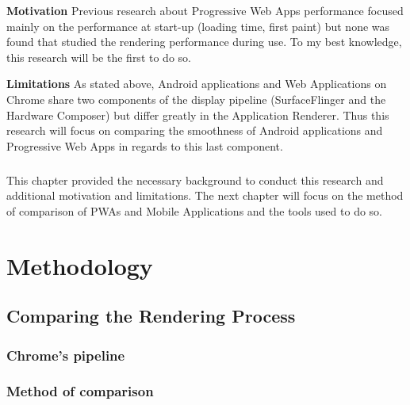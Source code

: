 \documentclass{kththesis}
\begin{document}
\textbf{Motivation} \newline
Previous research about Progressive Web Apps performance focused mainly on the performance at start-up (loading time, first paint) but none was found that studied the rendering performance during use. To my best knowledge, this research will be the first to do so.

\medskip
\textbf{Limitations} \newline
As stated above, Android applications and Web Applications on Chrome share two components of the display pipeline (SurfaceFlinger and the Hardware Composer) but differ greatly in the Application Renderer. Thus this research will focus on comparing the smoothness of Android applications and Progressive Web Apps in regards to this last component. 



\paragraph{}
This chapter provided the necessary background to conduct this research and additional motivation and limitations. The next chapter will focus on the method of comparison of PWAs and Mobile Applications and the tools used to do so.

    

\chapter{Methodology}
\section{Comparing the Rendering Process}
   

    \subsection{Chrome's pipeline}
    \subsection{Method of comparison}
\end{document}
